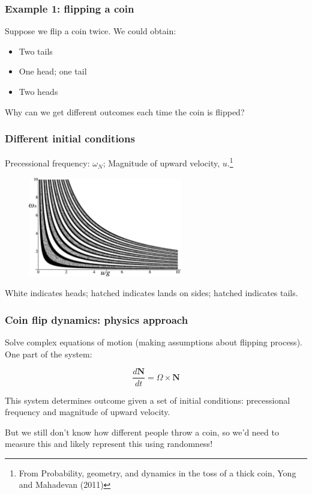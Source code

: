 \documentclass[handout]{beamer}
\begin{document}
\begin{frame}
	\frametitle{Example 1: flipping a coin}
	
	Suppose we flip a coin twice. We could obtain:
	
	\begin{itemize}
		\item Two tails
		\item One head; one tail
		\item Two heads
	\end{itemize}
	
	Why can we get different outcomes each time the coin is flipped?
	
\end{frame}

\begin{frame}
	\frametitle{Different initial conditions}
	
	Precessional frequency: $\omega_N$; Magnitude of upward velocity, $u$.\footnote{\tiny From Probability, geometry, and dynamics in the toss of a thick coin, Yong and Mahadevan (2011)}
	
	\begin{figure}[ht]
		\centerline{\includegraphics[width=0.6\textwidth]{./figures/coin_toss.pdf}}
	\end{figure}
	
	White indicates heads; hatched indicates lands on sides; hatched indicates tails.
	
\end{frame}

\begin{frame}
	\frametitle{Coin flip dynamics: physics approach}
	
	Solve complex equations of motion (making assumptions about flipping process). One part of the system:
	
	\begin{equation}
	\frac{d\boldsymbol{N}}{dt} = \Omega \times \boldsymbol{N}
	\end{equation}
	
	This system determines outcome given a set of initial conditions: precessional frequency and magnitude of upward velocity.
	
	\vspace{0.5cm}
	But we still don't know how different people throw a coin, so we'd need to measure this and likely represent this using randomness!
	
\end{frame}
\end{document}
